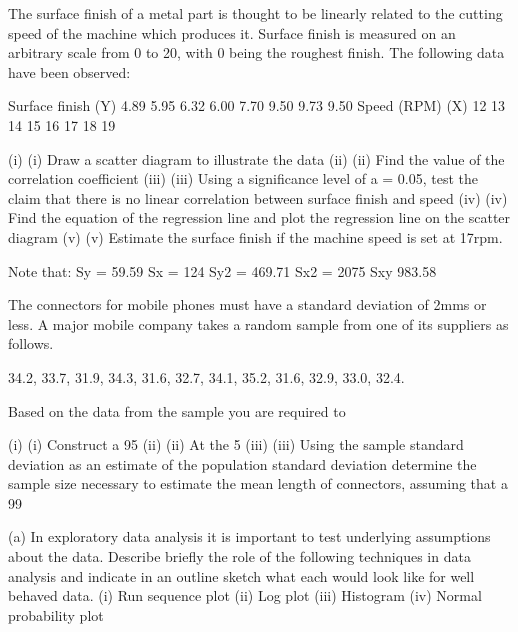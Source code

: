  
 

The surface finish of a metal part is thought to be linearly related to the cutting speed of the machine which produces it.  Surface finish is measured on an arbitrary scale from 0 to 20, with 0 being the roughest finish.  The following data have been observed:
 
Surface finish (Y)	4.89	5.95	6.32	6.00	7.70	9.50	9.73	9.50
Speed (RPM) (X)	12	13	14	15	16	17	18	19
 
(i)	(i)                  Draw a scatter diagram to illustrate the data
(ii)	(ii)                Find the value of the correlation coefficient
(iii)	(iii)               Using a significance level of a = 0.05, test the claim that there is no linear correlation between surface finish and speed
(iv)	(iv)              Find the equation of the regression line and plot the regression line on the scatter diagram
(v)	(v)                Estimate the surface finish if the machine speed is set at 17rpm. 
 
 
Note that:
Sy = 	59.59
Sx = 	124
Sy2 = 	469.71
Sx2 = 	2075
Sxy	983.58

 
The connectors for mobile phones must have a standard deviation of 2mms or less.  A major mobile company takes a random sample from one of its suppliers as follows.
 
34.2, 33.7, 31.9, 34.3, 31.6, 32.7, 34.1, 35.2, 31.6, 32.9, 33.0, 32.4.
 
Based on the data from the sample you are required to 
 
(i)	(i)                  Construct a 95%
(ii)	(ii)                At the 5%
(iii)	(iii)               Using the sample standard deviation as an estimate of the population standard deviation determine the sample size necessary to estimate the mean length of connectors, assuming that a 99%



(a)	In exploratory data analysis it is important to test underlying assumptions about the data.  Describe briefly the role of the following techniques in data analysis and indicate in an outline sketch what each would look like for well behaved data.
(i)	Run sequence plot
(ii)	Log plot
(iii)	Histogram
(iv)	Normal probability plot

